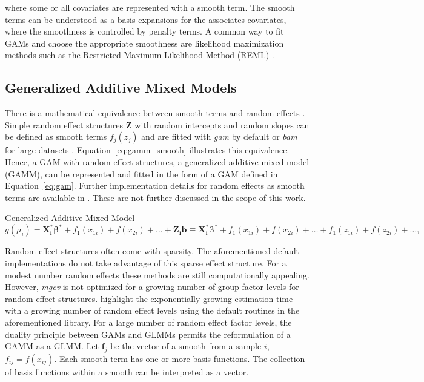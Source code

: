 where some or all covariates are represented with a smooth term. The smooth terms can be understood as a basis expansions for the associates covariates, where the smoothness is controlled by penalty terms. A common way to fit GAMs and choose the appropriate smoothness are likelihood maximization methods such as the Restricted Maximum Likelihood Method (REML) \citep{corbeil_restricted_1976}. 

\subsection{Generalized Additive Mixed Models}
There is a mathematical equivalence between smooth terms and random effects \citep[p. 239]{wood_generalized_2017}. Simple random effect structures $\mathbf{Z}$ with random intercepts and random slopes can be defined as smooth terms $f_j(z_j)$ and are fitted with \textit{gam} by default or \textit{bam} for large datasets \citep{wood_generalized_2015, wood_mgcv_2023}. Equation~\ref{eq:gamm_smooth} illustrates this equivalence. Hence, a GAM with random effect structures, a generalized additive mixed model (GAMM), can be represented and fitted in the form of a GAM defined in Equation~\ref{eq:gam}. Further implementation details for random effects as smooth terms are available in \cite{mgcv_smooth_construct}. These are not further discussed in the scope of this work.

\begin{defi}Generalized Additive Mixed Model
\begin{equation}\label{eq:gamm_smooth}
    g(\mu_i) = \mathbf{X_i^*}\bm{\beta^*} + f_1(x_{1i}) + f(x_{2i}) + \dots + \mathbf{Z_i}\bm{b} \equiv \mathbf{X_i^*}\bm{\beta^*} + f_1(x_{1i}) + f(x_{2i}) + \dots + f_1(z_{1i}) + f(z_{2i}) + \dots,
\end{equation}
\end{defi}

Random effect structures often come with sparsity. The aforementioned default implementations do not take advantage of this sparse effect structure. For a modest number random effects these methods are still computationally appealing. However, \textit{mgcv} is not optimized for a growing number of group factor levels for random effect structures. \citet{brooks_glmmtmb_2017} highlight the exponentially growing estimation time with a growing number of random effect levels using the default routines in the aforementioned library. For a large number of random effect factor levels, the duality principle between GAMs and GLMMs permits the reformulation of a GAMM as a GLMM. Let $\bm{f}_j$ be the vector of a smooth from a sample $i$, $f_{ij}=f(x_{ij})$. Each smooth term has one or more basis functions. The collection of basis functions within a smooth can be interpreted as a vector.

